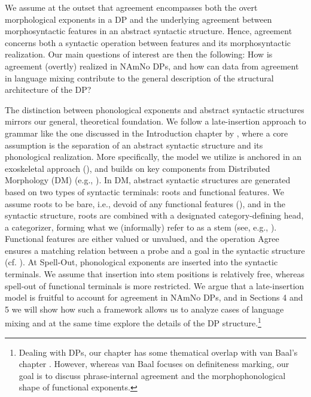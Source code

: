 \documentclass[output=paper]{langscibook}
\begin{document}
We assume at the outset that agreement encompasses both the overt morphological exponents in a DP and the underlying agreement between morphosyntactic features in an abstract syntactic structure. Hence, agreement concerns both a syntactic operation between features and its morphosyntactic realization. Our main questions of interest are then the following: How is agreement (overtly) realized in NAmNo DPs, and how can data from agreement in language mixing contribute to the general description of the structural architecture of the DP?



The distinction between phonological exponents and abstract syntactic structures mirrors our general, theoretical foundation. We follow a late-insertion approach to grammar like the one discussed in the Introduction chapter by , where a core assumption is the separation of an abstract syntactic structure and its phonological realization. More specifically, the model we utilize is anchored in an exoskeletal approach (\citealt{Borer2005a,Borer2005b,Borer2013}), and builds on key components from Distributed Morphology (DM) (e.g., \citealt{HarleyNoyer1999, EmbickNoyer2007, Embick2015}). In DM, abstract syntactic structures are generated based on two types of syntactic terminals: roots and functional features. We assume roots to be bare, i.e., devoid of any functional features (\citealt{Arad2005, Borer2014, Marantz1997}), and in the syntactic structure, roots are combined with a designated category-defining head, a categorizer, forming what we (informally) refer to as a stem (see, e.g., \citealt{Embick2015}). Functional features are either valued or unvalued, and the operation Agree ensures a matching relation between a probe and a goal in the syntactic structure (cf. ). At Spell-Out, phonological exponents are inserted into the syntactic terminals. We assume that insertion into stem positions is relatively free, whereas spell-out of functional terminals is more restricted. We argue that a late-insertion model is fruitful to account for agreement in NAmNo DPs, and in Sections 4 and 5 we will show how such a framework allows us to analyze cases of language mixing and at the same time explore the details of the DP structure.\footnote{Dealing with DPs, our chapter has some thematical overlap with van Baal’s chapter . However, whereas van Baal focuses on definiteness marking, our goal is to discuss phrase-internal agreement and the morphophonological shape of functional exponents.} 
\end{document}
